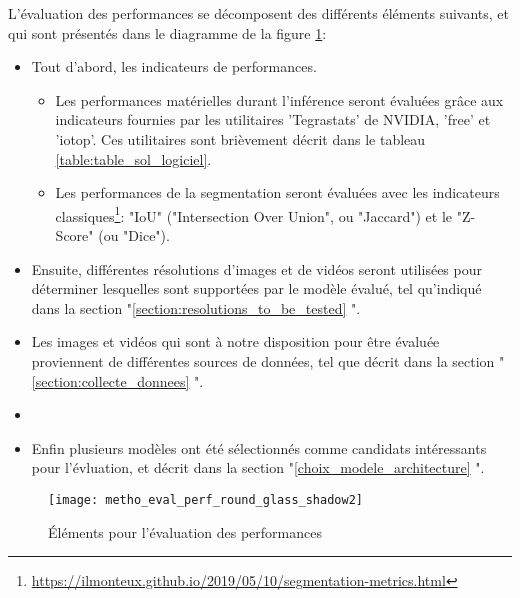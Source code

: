 ﻿L’évaluation des performances se décomposent des différents éléments suivants, et qui sont présentés dans le diagramme de la figure \ref{fig:metho_eval}: 
\begin{itemize}
    \item Tout d'abord, les indicateurs de performances.
    \begin{itemize}
        \item Les performances matérielles durant l'inférence seront évaluées grâce aux indicateurs fournies par les utilitaires 'Tegrastats' de NVIDIA, 'free' et 'iotop'. Ces utilitaires sont brièvement décrit dans le tableau \ref{table:table_sol_logiciel}.
        \item Les performances de la segmentation seront évaluées avec les indicateurs classiques\footnote{\url{https://ilmonteux.github.io/2019/05/10/segmentation-metrics.html}}: "IoU" ("Intersection Over Union", ou "Jaccard") et le "Z-Score" (ou "Dice").
    \end{itemize}
    \item Ensuite, différentes résolutions d'images et de vidéos seront utilisées pour déterminer lesquelles sont supportées par le modèle évalué, tel qu'indiqué dans la section "\ref{section:resolutions_to_be_tested} ". 
    \item Les images et vidéos qui sont à notre disposition pour être évaluée proviennent de différentes sources de données, tel que décrit dans la section "\ref{section:collecte_donnees} ". 
    \item \item Enfin plusieurs modèles ont été sélectionnés comme candidats intéressants pour l'évluation, et décrit dans la section "\ref{choix_modele_architecture} ".
\end{itemize} 
\label{metho_eval}
\begin{figure}[H]
    \centering
    \texttt{[image: metho\_eval\_perf\_round\_glass\_shadow2]}
    \caption{Éléments pour l'évaluation des performances}
    \label{fig:metho_eval}
\end{figure}
